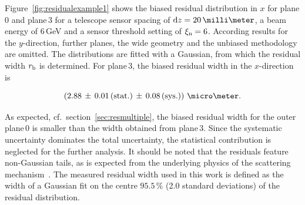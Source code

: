 Figure~\ref{fig:residualexample1} shows the biased residual distribution in $x$ for plane\,0 and plane\,3 for a telescope sensor spacing of $\dz = 20\,\milli\meter$,
 a beam energy of 6\,GeV and a sensor threshold setting of $\xi_{\textrm{n}} = 6$. 
According results for the $y$-direction, further planes, the wide geometry and the unbiased methodology are omitted. 
The distributions are fitted with a Gaussian, from which the residual width $r_{\textrm{b}}$ is determined. 
For plane\,3, the biased residual width in the $x$-direction is 

\begin{equation}
\left( 2.88\,\pm\, 0.01\,\textrm{(stat.)}\,\pm\, 0.08\, \textrm{(sys.)}\right)\,\micro\meter.
\end{equation}

\noindent
As expected, cf.\ section~\ref{sec:resmultiple}, the biased residual width for the outer plane\,0 is smaller than the width obtained from plane\,3.
Since the systematic uncertainty dominates the total uncertainty, the statistical contribution is neglected for the further analysis. 
It should be noted that the residuals feature non-Gaussian tails, as is expected from the underlying physics of the scattering mechanism~\cite{ref:PDG-2014}. 
The measured residual width used in this work is defined as the width of a Gaussian fit on the centre $95.5\,\%$ (2.0 standard deviations) of the residual distribution.

% 

